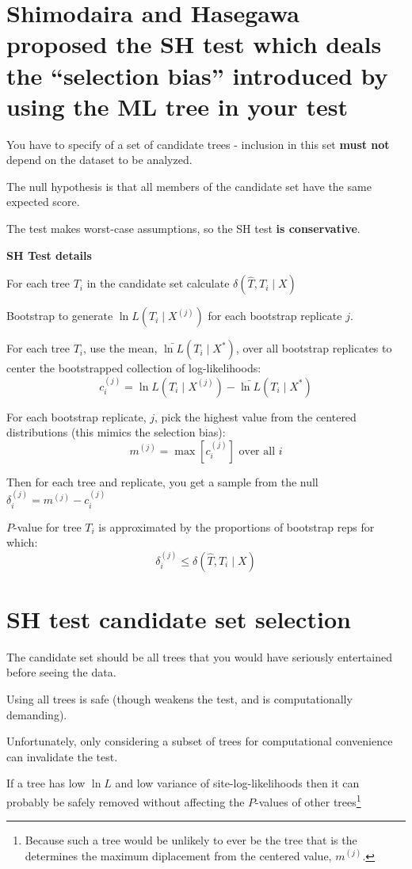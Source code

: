 \documentclass[landscape]{foils}
\begin{document}
\myNewSlide 
\section*{Shimodaira and Hasegawa proposed the SH test which deals the ``selection bias'' introduced by using the ML tree in your test}
You have to specify of a set of candidate trees - inclusion in this set {\bf must not} depend on the dataset to be analyzed.

The null hypothesis is that all members of the candidate set have the same expected score.

The test makes worst-case assumptions, so the SH test {\bf is conservative}.

\myNewSlide
{\bf SH Test details}
\normalsize
\begin{compactitem}
	\item For each tree $T_i$ in the candidate set calculate $\delta(\hat{T}, T_i \mid X)$
	\item Bootstrap to generate ${\ln L}(T_i \mid X^{(j)})$ for each bootstrap replicate $j$.
	\item For each tree $T_i$, use the mean, $\bar{\ln L}(T_i \mid X^{\ast})$, over all bootstrap replicates to center the bootstrapped collection of log-likelihoods:
		$$c_i^{(j)} = {\ln L}(T_i \mid X^{(j)})-\bar{\ln L}(T_i \mid X^{\ast})$$
	\item For each bootstrap replicate, $j$, pick the highest value from the centered distributions (this mimics the selection bias): $$m^{(j)} = \max\left[c_i^{(j)}\right] \mbox{ over all } i$$
	\item Then for each tree and replicate, you get a sample from the null $\delta_i^{(j)} = m^{(j)} - c_i^{(j)}$
	\item $P$-value for tree $T_i$ is approximated by the proportions of bootstrap reps for which: $$\delta_i^{(j)} \leq \delta(\hat{T}, T_i \mid X)$$
\end{compactitem}

\myNewSlide
\section*{SH test candidate set selection}
\large
\begin{compactitem}
	\item The candidate set should be all trees that you would have seriously entertained before seeing the data. 
	\item Using all trees is safe (though weakens the test, and is computationally demanding).
	\item Unfortunately, only considering a subset of trees for computational convenience can invalidate the test.
	\item If a tree has low $\ln L$ and low variance of site-log-likelihoods then it can probably be safely removed without affecting the $P$-values of other trees\footnote{Because such a tree would be unlikely to ever be the tree that is the determines the maximum diplacement from the centered value, $m^{(j)}$.}
\end{compactitem}
\end{document}
